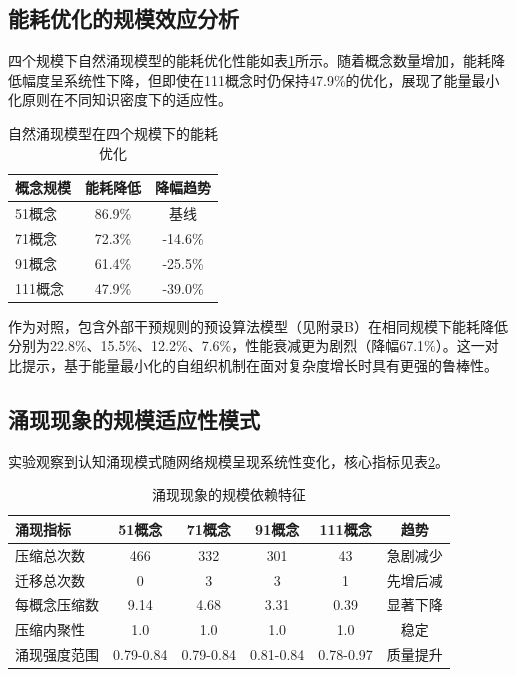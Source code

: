 \documentclass[12pt,a4paper]{article}
\begin{document}
\subsection{能耗优化的规模效应分析}

四个规模下自然涌现模型的能耗优化性能如表\ref{tab:multi_scale_energy}所示。随着概念数量增加，能耗降低幅度呈系统性下降，但即使在111概念时仍保持47.9\%的优化，展现了能量最小化原则在不同知识密度下的适应性。

\begin{table}[h]
\centering
\caption{自然涌现模型在四个规模下的能耗优化}
\label{tab:multi_scale_energy}
\begin{tabular}{lcc}
\toprule
\textbf{概念规模} & \textbf{能耗降低} & \textbf{降幅趋势} \\
\midrule
51概念 & 86.9\% & 基线 \\
71概念 & 72.3\% & -14.6\% \\
91概念 & 61.4\% & -25.5\% \\
111概念 & 47.9\% & -39.0\% \\
\bottomrule
\end{tabular}
\end{table}

作为对照，包含外部干预规则的预设算法模型（见附录B）在相同规模下能耗降低分别为22.8\%、15.5\%、12.2\%、7.6\%，性能衰减更为剧烈（降幅67.1\%）。这一对比提示，基于能量最小化的自组织机制在面对复杂度增长时具有更强的鲁棒性。

\subsection{涌现现象的规模适应性模式}

实验观察到认知涌现模式随网络规模呈现系统性变化，核心指标见表\ref{tab:scale_dependent_emergence}。

\begin{table}[h]
\centering
\caption{涌现现象的规模依赖特征}
\label{tab:scale_dependent_emergence}
\begin{tabular}{lccccc}
\toprule
\textbf{涌现指标} & \textbf{51概念} & \textbf{71概念} & \textbf{91概念} & \textbf{111概念} & \textbf{趋势} \\
\midrule
压缩总次数 & 466 & 332 & 301 & 43 & 急剧减少 \\
迁移总次数 & 0 & 3 & 3 & 1 & 先增后减 \\
每概念压缩数 & 9.14 & 4.68 & 3.31 & 0.39 & 显著下降 \\
压缩内聚性 & 1.0 & 1.0 & 1.0 & 1.0 & 稳定 \\
涌现强度范围 & 0.79-0.84 & 0.79-0.84 & 0.81-0.84 & 0.78-0.97 & 质量提升 \\
\bottomrule
\end{tabular}
\end{table}
\end{document}
